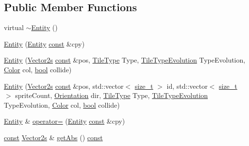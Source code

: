 \subsection*{Public Member Functions}
\begin{DoxyCompactItemize}
\item 
virtual \hyperlink{classarcade_1_1_entity_ab9ece5d5ebfb1bd777b3bb4679675038}{$\sim$\-Entity} ()
\item 
\hyperlink{classarcade_1_1_entity_a21ee1d86ac3296c2d00350a87d096133}{Entity} (\hyperlink{classarcade_1_1_entity}{Entity} \hyperlink{term__entry_8h_a57bd63ce7f9a353488880e3de6692d5a}{const} \&cpy)
\item 
\hyperlink{classarcade_1_1_entity_a49c35920269301b6588ae657a821c9be}{Entity} (\hyperlink{namespacearcade_a8e527f7400fbff9c38dc31e0a3dd06a1}{Vector2s} \hyperlink{term__entry_8h_a57bd63ce7f9a353488880e3de6692d5a}{const} \&pos, \hyperlink{namespacearcade_a61ba576694ea309cdf2b4b66902408ca}{Tile\-Type} Type, \hyperlink{namespacearcade_a2e0a64a64203f78c9efb84a1475a8cf4}{Tile\-Type\-Evolution} Type\-Evolution, \hyperlink{unionarcade_1_1_color}{Color} col, \hyperlink{term__entry_8h_a002004ba5d663f149f6c38064926abac}{bool} collide)
\item 
\hyperlink{classarcade_1_1_entity_af8fd394535036b1602d5177205ebb8dc}{Entity} (\hyperlink{namespacearcade_a8e527f7400fbff9c38dc31e0a3dd06a1}{Vector2s} \hyperlink{term__entry_8h_a57bd63ce7f9a353488880e3de6692d5a}{const} \&pos, std\-::vector$<$ \hyperlink{nc__alloc_8h_a7b60c5629e55e8ec87a4547dd4abced4}{size\-\_\-t} $>$ id, std\-::vector$<$ \hyperlink{nc__alloc_8h_a7b60c5629e55e8ec87a4547dd4abced4}{size\-\_\-t} $>$ sprite\-Count, \hyperlink{namespacearcade_a370755573a2c68e25c59bedd4bce1342}{Orientation} dir, \hyperlink{namespacearcade_a61ba576694ea309cdf2b4b66902408ca}{Tile\-Type} Type, \hyperlink{namespacearcade_a2e0a64a64203f78c9efb84a1475a8cf4}{Tile\-Type\-Evolution} Type\-Evolution, \hyperlink{unionarcade_1_1_color}{Color} col, \hyperlink{term__entry_8h_a002004ba5d663f149f6c38064926abac}{bool} collide)
\item 
\hyperlink{classarcade_1_1_entity}{Entity} \& \hyperlink{classarcade_1_1_entity_ad21d88753349b1bf1b0972ba1d38f923}{operator=} (\hyperlink{classarcade_1_1_entity}{Entity} \hyperlink{term__entry_8h_a57bd63ce7f9a353488880e3de6692d5a}{const} \&cpy)
\item 
\hyperlink{term__entry_8h_a57bd63ce7f9a353488880e3de6692d5a}{const} \hyperlink{namespacearcade_a8e527f7400fbff9c38dc31e0a3dd06a1}{Vector2s} \& \hyperlink{classarcade_1_1_entity_acd44c89f38f0737cf483681aa88519c7}{get\-Abs} () \hyperlink{term__entry_8h_a57bd63ce7f9a353488880e3de6692d5a}{const} 

\end{DoxyCompactItemize}
